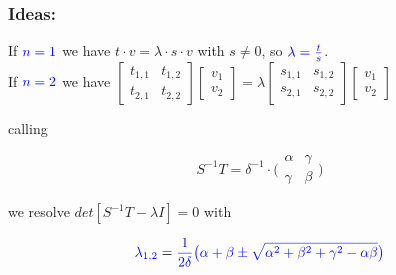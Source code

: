 \documentclass{beamer}
\theoremstyle{definition} \newtheorem{de}{Def}
\theoremstyle{remark} \newtheorem{os}[de]{Remark}
\theoremstyle{plain} \newtheorem{te}[de]{Teo}
\theoremstyle{plain} \newtheorem{co}[de]{Cor}
\theoremstyle{plain} \newtheorem{pr}[de]{Prop}
\theoremstyle{plain} \newtheorem{lem}[de]{Lemm}
\theoremstyle{remark} \newtheorem{rem}[de]{Remark}
\begin{document}
\begin{frame}
  \frametitle{Ideas:}
  If $\textcolor{blue}{n=1}$ we have $t\cdot v=\lambda\cdot s\cdot v$ with $s\ne 0$, so 
  $\textcolor{blue}{\lambda= \frac{t}{s}}$.\\
  
  If $\textcolor{blue}{n=2}$ we have $\begin{bmatrix}t_{1,1}&t_{1,2}\\ t_{2,1} & t_{2,2}\end{bmatrix} \begin{bmatrix}v_{1} \\ v_{2}\end{bmatrix} = \lambda \begin{bmatrix}s_{1,1} & s_{1,2}\\ s_{2,1} & s_{2,2}\end{bmatrix} \begin{bmatrix}v_{1} \\ v_{2}\end{bmatrix}$
  
  
  calling 

  \begin{equation*}
    S^{-1}T = \delta^{-1} \cdot \Big( \begin{matrix} \alpha & \gamma \\ \gamma & \beta \end{matrix}\Big)
  \end{equation*}

  we resolve $det[ S^{-1}T - \lambda I ]=0$ with

  \begin{equation*}
    \textcolor{blue}{\lambda_{1,2}} = \textcolor{blue}{\frac{1}{2\delta}  
  \big( \alpha+\beta \pm \sqrt{ \alpha^2 + \beta^2 + 
  \gamma^2 - \alpha\beta } \big)}
  \end{equation*}

\end{frame}
\end{document}
